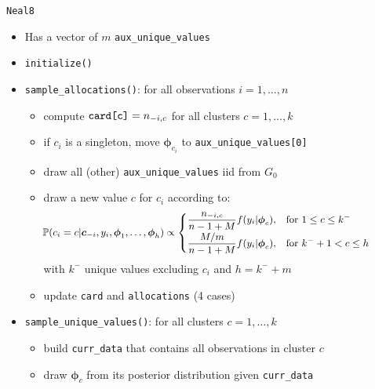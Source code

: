 \begin{frame}[fragile]{\texttt{Neal8}} %
	\begin{itemize}
		\item Has a vector of $m$ \verb|aux_unique_values|
		\item \verb|initialize()|
		\item \verb|sample_allocations()|: for all observations $i=1,\dots,n$
		\begin{itemize}
			\item compute $\verb|card[c]| = n_{-i,c}$ for all clusters $c=1,\dots,k$
			\item if $c_i$ is a singleton, move $\boldsymbol\phi_{c_i}$ to \verb|aux_unique_values[0]|
			\item draw all (other) \verb|aux_unique_values| iid from $G_0$
			\item draw a new value $c$ for $c_i$ according to:
			\begin{align*}
				\small
				\hspace{-30pt}
				\PP(c_{i}=c | \boldsymbol c_{-i}, y_{i}, \boldsymbol\phi_{1},\dots,\boldsymbol\phi_{h}) \propto
				\begin{cases}
				\dfrac{n_{-i,c}}{n-1+M}f(y_{i}|\boldsymbol\phi_{c}), & \mbox{for } 1 \leq c \leq k^{-} \\[5pt]
				\dfrac{M/m}{n-1+M}f(y_{i}|\boldsymbol\phi_{c}), & \mbox{for } k^{-}+1 < c \leq h
				\end{cases}
			\end{align*}
			with $k^-$ unique values excluding $c_i$ and $h = k^-+m$
			\item update \verb|card| and \verb|allocations| (4 cases)
		\end{itemize}
		\item \verb|sample_unique_values()|: for all clusters $c = 1,\dots,k$
		\begin{itemize}
			\item build \verb|curr_data| that contains all observations in cluster $c$
			\item draw $\boldsymbol\phi_c$ from its posterior distribution given \verb|curr_data|
		\end{itemize}
	\end{itemize}
\end{frame}


